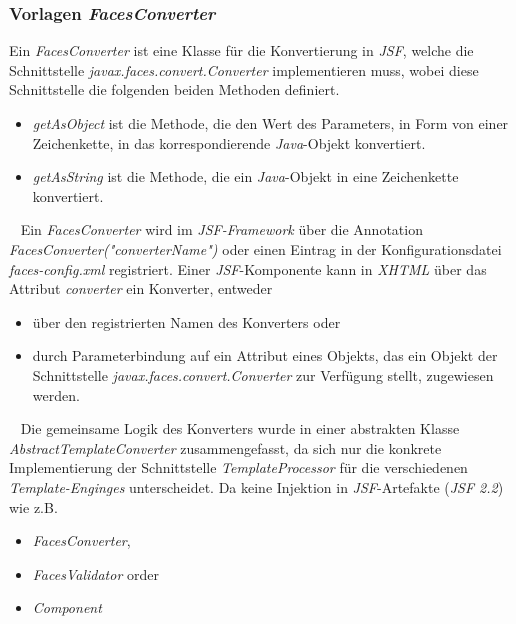\subsubsection{Vorlagen \emph{FacesConverter}}
Ein \emph{FacesConverter} ist eine Klasse für die Konvertierung in \emph{JSF}, welche die Schnittstelle \emph{javax.faces.convert.Converter} implementieren muss, wobei diese Schnittstelle die folgenden beiden Methoden definiert.
\begin{itemize}
	\item\emph{getAsObject}
	\newline
	ist die Methode, die den Wert des Parameters, in Form von einer Zeichenkette, in das korrespondierende \emph{Java}-Objekt konvertiert.
	\item\emph{getAsString}
	\newline
	ist die Methode, die ein \emph{Java}-Objekt in eine Zeichenkette konvertiert.
\end{itemize}
\ \newline
Ein \emph{FacesConverter} wird im \emph{JSF-Framework} über die Annotation \emph{FacesConverter("converterName")} oder einen Eintrag in der  Konfigurationsdatei \emph{faces-config.xml} registriert. Einer \emph{JSF}-Komponente kann in \emph{XHTML} über das Attribut \emph{converter} ein Konverter, entweder 
\begin{itemize}
	\item über den registrierten Namen des Konverters oder 
	\item durch Parameterbindung auf ein Attribut eines Objekts, das ein Objekt der Schnittstelle \emph{javax.faces.convert.Converter} zur Verfügung stellt, zugewiesen werden.
\end{itemize}
\ \newline
Die gemeinsame Logik des Konverters wurde in einer abstrakten Klasse \emph{AbstractTemplateConverter} zusammengefasst, da sich nur die konkrete Implementierung der Schnittstelle \emph{TemplateProcessor} für die verschiedenen \emph{Template-Enginges} unterscheidet. Da keine Injektion in \emph{JSF}-Artefakte (\emph{JSF 2.2}) wie z.B.
\begin{itemize}
	\item\emph{FacesConverter},
	\item\emph{FacesValidator} order
	\item\emph{Component}
\end{itemize}
